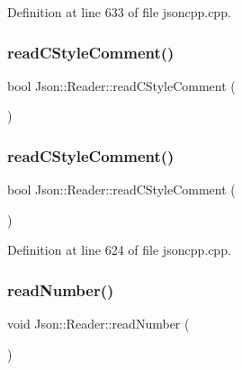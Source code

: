 Definition at line 633 of file jsoncpp.\+cpp.

\hypertarget{class_json_1_1_reader_ae0ffe796abdc3c5851589ee500e28c79}{}\label{class_json_1_1_reader_ae0ffe796abdc3c5851589ee500e28c79} 
\subsubsection{\texorpdfstring{read\+C\+Style\+Comment()}{readCStyleComment()}\hspace{0.1cm}{\footnotesize\ttfamily [1/2]}}
{\footnotesize\ttfamily bool Json\+::\+Reader\+::read\+C\+Style\+Comment (\begin{DoxyParamCaption}{ }\end{DoxyParamCaption})\hspace{0.3cm}{\ttfamily [private]}}

\hypertarget{class_json_1_1_reader_ae0ffe796abdc3c5851589ee500e28c79}{}\label{class_json_1_1_reader_ae0ffe796abdc3c5851589ee500e28c79} 
\subsubsection{\texorpdfstring{read\+C\+Style\+Comment()}{readCStyleComment()}\hspace{0.1cm}{\footnotesize\ttfamily [2/2]}}
{\footnotesize\ttfamily bool Json\+::\+Reader\+::read\+C\+Style\+Comment (\begin{DoxyParamCaption}{ }\end{DoxyParamCaption})\hspace{0.3cm}{\ttfamily [private]}}



Definition at line 624 of file jsoncpp.\+cpp.

\hypertarget{class_json_1_1_reader_afb31bfda6bb27d6453057a47655e8363}{}\label{class_json_1_1_reader_afb31bfda6bb27d6453057a47655e8363} 
\subsubsection{\texorpdfstring{read\+Number()}{readNumber()}\hspace{0.1cm}{\footnotesize\ttfamily [1/2]}}
{\footnotesize\ttfamily void Json\+::\+Reader\+::read\+Number (\begin{DoxyParamCaption}{ }\end{DoxyParamCaption})\hspace{0.3cm}{\ttfamily [private]}}

